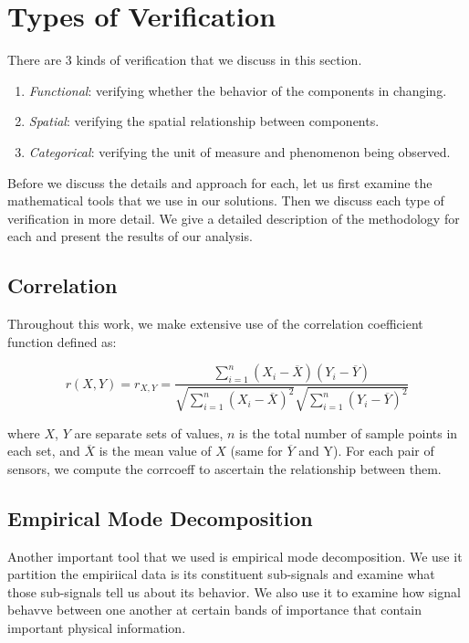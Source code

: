 \section{Types of Verification}
There are 3 kinds of verification that we discuss in this section.

\begin{enumerate}
\item \emph{Functional}: verifying whether the behavior of the components in changing.
\item \emph{Spatial}: 	verifying the spatial relationship between components.
\item \emph{Categorical}: verifying the unit of measure and phenomenon being observed.
\end{enumerate}

Before we discuss the details and approach for each, let us first examine the mathematical tools that we
use in our solutions.  Then we discuss each type of verification in more detail.  We give a detailed description 
of the methodology for each and present the results of our analysis.

\subsection{Correlation}
Throughout this work, we make extensive use of the correlation coefficient function defined as: 

\begin{displaymath}
r(X,Y) = r_{X, Y} = \frac{\sum_{i=1}^{n} (X_{i} - \overline{X})(Y_{i} - \overline{Y})}
{\sqrt{\sum_{i=1}^{n} (X_{i} - \overline{X})^2}\sqrt{\sum_{i=1}^{n} (Y_{i} - \overline{Y})^2}}
\end{displaymath}

where $X$, $Y$ are separate sets of values, $n$ is the total number of sample points in 
each set, and $\overline{X}$ is the mean value of $X$ (same for $\overline{Y}$ and Y).  %
For each pair of sensors, we compute the corrcoeff to ascertain the relationship between them.


\subsection{Empirical Mode Decomposition} \label{emd}
Another important tool that we used is empirical mode decomposition.  We use it partition the empiriical data is its constituent
sub-signals and examine what those sub-signals tell us about its behavior.  We also use it to examine how signal behavve between
one another at certain bands of importance that contain important physical information.

